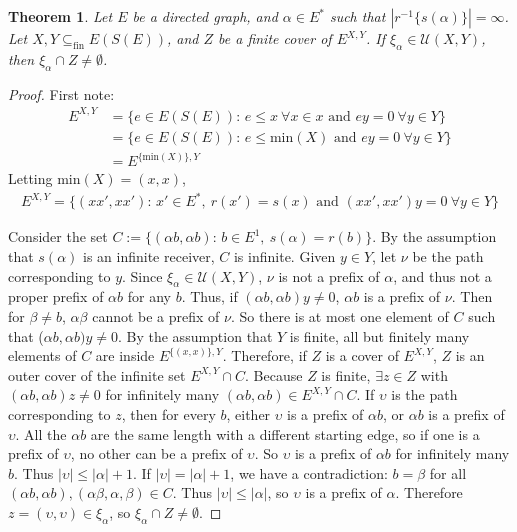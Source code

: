 \documentclass{article}
\newtheorem{theorem}{Theorem}[section]
\theoremstyle{definition}
\begin{document}
\begin{theorem} Let $E$ be a directed graph, and $\alpha \in E^*$ such that $|r^{-1}\{s(\alpha)\}| = \infty$.
    Let $X, Y \subseteq_{\text{fin}} E(S(E))$, and $Z$ be a finite cover of $E^{X, Y}$.
If $\xi_\alpha \in \mathcal{U}(X, Y)$, then $\xi_\alpha \cap Z \neq \emptyset$. \end{theorem}
\begin{proof}
    First note:
    \begin{align*}
        E^{X, Y} &= \{ e \in E(S(E))\text{: } e \leq x \ \forall x \in x \text{ and } ey = 0 \ \forall y \in Y \} \\
                 &= \{ e \in E(S(E))\text{: } e \leq \text{min}(X) \text{ and } ey = 0 \ \forall y \in Y \} \\
                 &= E^{\{\text{min}(X)\}, Y}
    \end{align*}
    Letting min$(X) = (x, x)$,
    \begin{align*}
        E^{X, Y} = \{ (xx', xx') \text{: } x' \in E^*, \ r(x') = s(x) \text{ and } (xx', xx')y = 0 \ \forall y \in Y \}
    \end{align*}

    Consider the set $C := \{ (\alpha b, \alpha b)\text{: } b \in E^1, \ s(\alpha) = r(b) \}$. By the assumption
    that $s(\alpha)$ is an infinite receiver, $C$ is infinite. Given $y \in Y$, let $\nu$ be the path corresponding to $y$.
    Since $\xi_\alpha \in \mathcal{U}(X, Y)$, $\nu$ is not a prefix of $\alpha$, and thus not a proper prefix of $\alpha b$ 
    for any $b$. Thus, if $(\alpha b, \alpha b)y \neq 0$, $\alpha b$ is a prefix of $\nu$. Then for $\beta \neq b$, 
    $\alpha \beta$ cannot be a prefix of $\nu$. So there is at most one element of $C$ such that ($\alpha b, \alpha b)y \neq 0$.
    By the assumption that $Y$ is finite, all but finitely many elements of $C$ are inside $E^{\{(x, x)\}, Y}$. Therefore, if $Z$
    is a cover of $E^{X, Y}$, $Z$ is an outer cover of the infinite set $E^{X, Y} \cap C$. Because $Z$ is finite, $\exists z \in Z$ 
    with $(\alpha b, \alpha b)z \neq 0$ for infinitely many $(\alpha b, \alpha b) \in E^{X, Y} \cap C$. If $\upsilon$ is the path corresponding to $z$,
    then for every $b$, either $\upsilon$ is a prefix of $\alpha b$, or $\alpha b$ is a prefix of $\upsilon$.
    All the $\alpha b$ are the same length with a different starting edge, so if one is a prefix of $\upsilon$,
    no other can be a prefix of $\upsilon$. So $\upsilon$ is a prefix of $\alpha b$ for infinitely many $b$. Thus $|\upsilon| \leq |\alpha| + 1$.
    If $|\upsilon| = |\alpha| + 1$, we have a contradiction: $b = \beta$ for all $(\alpha b, \alpha b), (\alpha \beta, \alpha, \beta) \in C$.
    Thus $|\upsilon| \leq |\alpha|$, so $\upsilon$ is a prefix of $\alpha$. Therefore $z = (\upsilon, \upsilon) \in \xi_\alpha$, so 
    $\xi_\alpha \cap Z \neq \emptyset$.
\end{proof}
\end{document}
